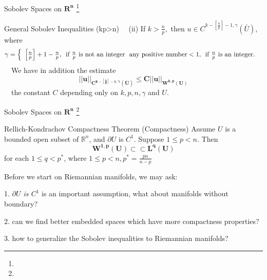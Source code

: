 \documentclass[xcolor=table,dvipsnames,svgnames,aspectratio=169,fontset=fandol]{ctexbeamer}
\let\\\relax
\begin{document}
\begin{frame}{Sobolev Spaces on $\mathbf{R^n}$  \footnote{}}
  \begin{alertblock}{General Sobolev Inequalities (kp>n)}
  ~~(ii) If $k>\frac{n}{p},$ then $u \in C^{k-\left[\frac{n}{p}\right]-1, \gamma}(\bar{U})$, where
  $$
  \gamma=\left\{\begin{array}{l}
  {\left[\frac{n}{p}\right]+1-\frac{n}{p},\, \text { if } \frac{n}{p} \text { is not an integer }} \\
  \text { any positive number}<1,\, \text { if } \frac{n}{p} \text { is an integer. }
  \end{array}\right.
  $$
  ~~We have in addition the estimate
  $$
  \bm
  {||u||_{C^{k-\left[\frac{n}{p}\right]-1, \gamma}(\bar{U})} \leq C||u||_{W^{k, p}(U)}}
  $$
  ~~the constant $C$ depending only on $k, p, n, \gamma$ and $U$.
  \end{alertblock}
\end{frame}

\begin{frame}{Sobolev Spaces on $\mathbf{R^n}$  \footnote{}}
  \begin{alertblock}{Rellich-Kondrachov Compactness Theorem (Compactness)}
    Assume $U$ is a bounded open subset of $\mathbb{R}^n$, and $\partial U$ is $C^1$. Suppose $1 \leq p<n$. Then
    $$
    \bm
    {W^{1, p}(U) \subset \subset L^q(U)}
    $$
    for each $1 \leq q<p^*$, where $1 \leq p<n, p^*=\frac{p n}{n-p}$
    \end{alertblock}
    
    \vskip 5pt
    Before we start on Riemannian manifolds, we may ask:
    
    1. \textit{$\partial U$ is $C^1$} is an important assumption, what about manifolds without boundary?

    2. can we find better embedded spaces which have more compactness properties? 

    3. how to generalize the Sobolev inequalities to Riemannian manifolds?
  \end{frame}
\end{document}
